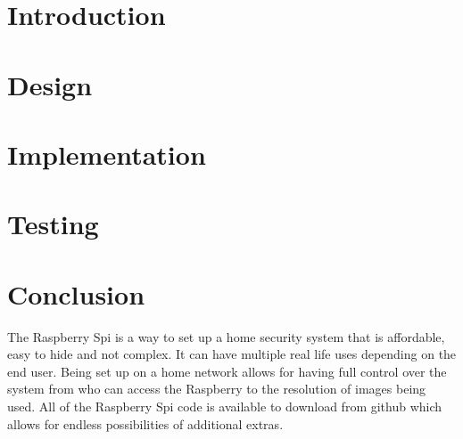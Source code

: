 \documentclass[]{report}   %
\begin{document}


\tableofcontents
\chapter {Introduction}
\label {ch:intro} 
% 
% 
\chapter {Design}
\label {ch:design}
%
%
%
\chapter {Implementation}
\label {ch:implem}
%
%
%
\chapter {Testing}
\label {ch:test}
%
%
%
%
%
\chapter {Conclusion}
\label {ch:concl}
%
%
%
%
%
\begin{small}
 The Raspberry Spi is a way to set up a home security system that is affordable, easy to hide and not complex. It can have multiple real life uses depending on the end user. Being set up on a home network allows for having full control over the system from who can access the Raspberry to the resolution of images being used. All of the Raspberry Spi code is available to download from github which allows for endless possibilities of additional extras.
\end{small}

	
\end{document}
